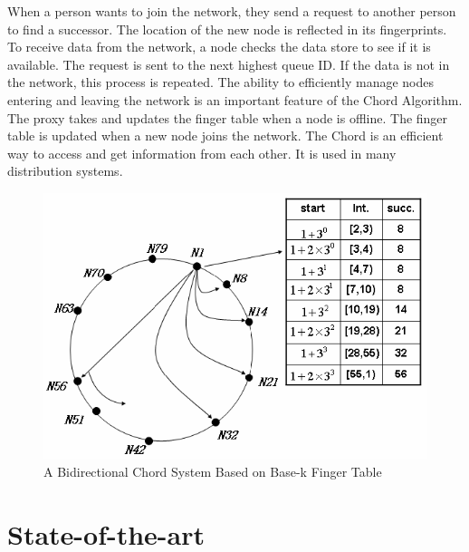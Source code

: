 \documentclass{article}
\begin{document}
When a person wants to join the network, they send a request to another person to find a successor. The location of the new node is reflected in its fingerprints. To receive data from the network, a node checks the data store to see if it is available. The request is sent to the next highest queue ID. If the data is not in the network, this process is repeated. The ability to efficiently manage nodes entering and leaving the network is an important feature of the Chord Algorithm. The proxy takes and updates the finger table when a node is offline. The finger table is updated when a new node joins the network. The Chord is an efficient way to access and get information from each other. It is used in many distribution systems.
\cite{reference_1}

\begin{figure}[h]
\centering
\includegraphics[width=\textwidth]{img/ChordAlgorithm}
\caption{A Bidirectional Chord System Based on Base-k Finger Table}
\label{figure 1}
\end{figure}

\pagebreak

\section{State-of-the-art}
\end{document}
